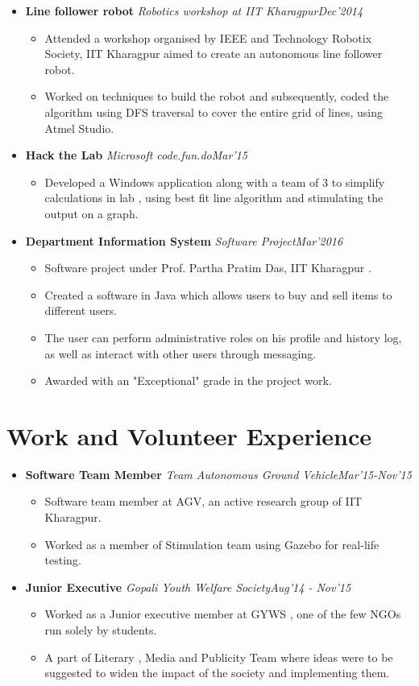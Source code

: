 \documentclass[11pt,a4paper]{moderncv}
\newcommand{\experience}[4]{
  \vspace{0.1cm}
\item \textbf{\large{#1}} \textit{#2}\hfill\textit{#3}
  \begin{itemize}[leftmargin=*]
    \setlength\itemsep{0em} #4
  \end{itemize}
}
\begin{document}
\begin{itemize}
  \experience{Line follower robot}{Robotics workshop at IIT Kharagpur}{Dec'2014}{
  \item Attended a workshop organised by IEEE and Technology Robotix Society, IIT Kharagpur aimed to create an autonomous line follower robot.
  \item Worked on techniques to build the robot and subsequently, coded the algorithm using DFS traversal to cover the entire grid of lines, using Atmel Studio.
  }

  \experience{Hack the Lab}{Microsoft code.fun.do}{Mar'15}{
  \item   Developed a Windows application along  with a team of 3 to simplify calculations in lab , using best fit line algorithm and stimulating the output on a graph.
  }

  \experience{Department Information System}{Software Project}{Mar'2016}{
  \item Software project under Prof. Partha Pratim Das, IIT Kharagpur .
  \item Created a software in Java which allows users to buy and sell items to different users.
  \item The user can perform administrative roles on his profile and history log, as well as interact with other users through messaging.
  \item Awarded with an "Exceptional" grade in the project work.
  }

\end{itemize}

\section*{Work and Volunteer Experience}
\begin{itemize}
  \setlength\itemsep{0.5em}

  \experience{Software Team Member}{Team Autonomous Ground Vehicle}{Mar'15-Nov'15}{
  \item Software team member at AGV, an active research group of IIT Kharagpur.
  \item Worked as a member of Stimulation team using Gazebo for real-life testing.
  }
    
  \experience{Junior Executive}{Gopali Youth Welfare Society}{Aug'14 - Nov'15}{
  \item Worked as a Junior executive member at GYWS , one of the few NGOs run solely by students.
  \item A part of Literary , Media and Publicity Team where  ideas were to be suggested to widen the impact of the society and implementing them.
  }

\end{itemize}
\end{document}
